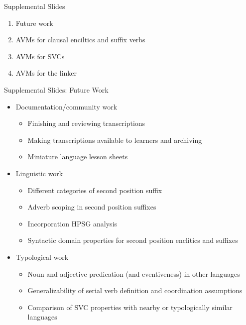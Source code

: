 \begin{frame}{Supplemental Slides}
\begin{enumerate}
\item Future work
\item AVMs for clausal enciltics and suffix verbs
\item AVMs for SVCs
\item AVMs for the linker
\end{enumerate}
\end{frame}

\begin{frame}[noframenumbering]{Supplemental Slides: Future Work}
\begin{itemize}
\item Documentation/community work
\begin{itemize}
\item Finishing and reviewing transcriptions
\item Making transcriptions available to learners and archiving
\item Miniature language lesson sheets \pause
\end{itemize}
\item Linguistic work
\begin{itemize}
\item Different categories of second position suffix
\item Adverb scoping in second position suffixes
\item Incorporation HPSG analysis
\item Syntactic domain properties for second position enclitics and suffixes \pause
\end{itemize}
\item Typological work
\begin{itemize}
\item Noun and adjective predication (and eventiveness) in other languages
\item Generalizability of serial verb definition and coordination assumptions
\item Comparison of SVC properties with nearby or typologically similar languages
\end{itemize}
\end{itemize}

\end{frame}


